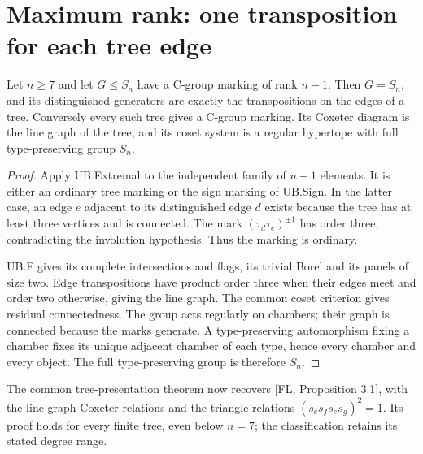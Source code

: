 \section{Maximum rank: one transposition for each tree edge}
\begin{theorem}\label{thm:maxrank}
Let $n\geq7$ and let $G\leq S_n$ have a C-group marking of rank $n-1$.
Then $G=S_n$, and its distinguished generators are exactly the
transpositions on the edges of a tree. Conversely every such tree
gives a C-group marking. Its Coxeter diagram is the line graph of the
tree, and its coset system is a regular hypertope with full
type-preserving group $S_n$.
\end{theorem}
\begin{proof}
Apply UB.Extremal to the independent family of $n-1$ elements.
It is either an ordinary tree marking or the sign marking of UB.Sign.
In the latter case, an edge $e$ adjacent to its distinguished edge $d$
exists because the tree has at least three vertices and is connected.
The mark $(\tau_d\tau_e)^{\pm1}$ has order three, contradicting the
involution hypothesis. Thus the marking is ordinary.

UB.F gives its complete intersections and flags, its trivial Borel
and its panels of size two. Edge transpositions have product order
three when their edges meet and order two otherwise, giving the line
graph. The common coset criterion gives residual connectedness.
The group acts regularly on chambers; their graph is connected because
the marks generate. A type-preserving automorphism fixing a chamber
fixes its unique adjacent chamber of each type, hence every chamber
and every object. The full type-preserving group is therefore $S_n$.
\end{proof}
The common tree-presentation theorem now recovers [FL, Proposition 3.1],
with the line-graph Coxeter relations and the triangle relations
$(s_es_fs_es_g)^2=1$. Its proof holds for every finite tree, even below
$n=7$; the classification retains its stated degree range.

